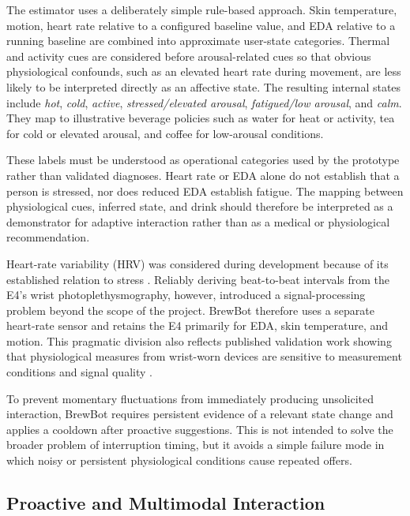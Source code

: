 The estimator uses a deliberately simple rule-based approach. Skin temperature,
motion, heart rate relative to a configured baseline value, and EDA relative to a
running baseline are combined into approximate user-state categories. Thermal and 
activity cues are considered before arousal-related cues so that obvious physiological
confounds, such as an elevated heart rate during movement, are less likely to be
interpreted directly as an affective state. The resulting internal states
include \emph{hot}, \emph{cold}, \emph{active},
\emph{stressed/elevated arousal}, \emph{fatigued/low arousal}, and
\emph{calm}. They map to illustrative beverage policies such as water for heat
or activity, tea for cold or elevated arousal, and coffee for low-arousal
conditions.

These labels must be understood as operational categories used by the prototype
rather than validated diagnoses. Heart rate or EDA alone do not establish that
a person is stressed, nor does reduced EDA establish fatigue. The mapping
between physiological cues, inferred state, and drink should therefore be
interpreted as a demonstrator for adaptive interaction rather than as a medical
or physiological recommendation.

Heart-rate variability (HRV) was considered during development because of its
established relation to stress \cite{kim2018hrv}. Reliably deriving
beat-to-beat intervals from the E4's wrist photoplethysmography, however,
introduced a signal-processing problem beyond the scope of the project. BrewBot
therefore uses a separate heart-rate sensor and retains the E4 primarily for
EDA, skin temperature, and motion. This pragmatic division also reflects
published validation work showing that physiological measures from wrist-worn
devices are sensitive to measurement conditions and signal quality
\cite{schuurmans2020e4, vanlier2020protocol}.

To prevent momentary fluctuations from immediately producing unsolicited
interaction, BrewBot requires persistent evidence of a relevant state change and
applies a cooldown after proactive suggestions. This is not intended to solve
the broader problem of interruption timing, but it avoids a simple failure mode
in which noisy or persistent physiological conditions cause repeated offers.

\subsection{Proactive and Multimodal Interaction}


